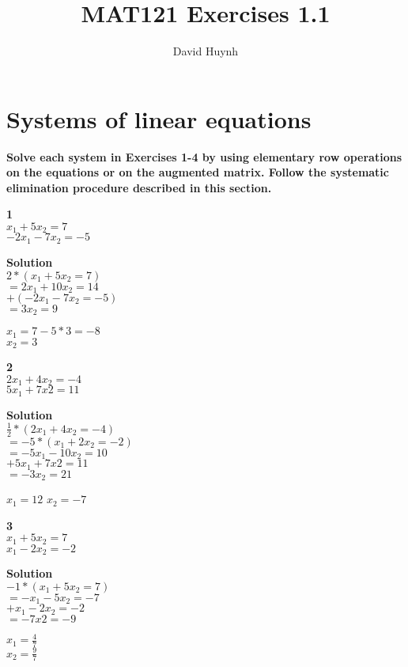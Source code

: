 \documentclass{article}
\begin{document}
\title{MAT121 Exercises 1.1}
\author{David Huynh}
\date{}

\maketitle

\section{Systems of linear equations}

\bf{Solve each system in Exercises 1-4 by using elementary row operations on the equations or on the augmented matrix. Follow the systematic elimination procedure described in this section.}

\bf{1}\\
$x_{1} + 5x_{2} = 7$\\
$-2x_{1} - 7x_{2} = -5$

\bf{Solution}\\
$2*(x_{1} + 5x_{2} = 7)$\\
$= 2x_{1} + 10x_{2} = 14$\\
$+(-2x_{1} - 7x_{2} = -5)$\\
$= 3x_{2} = 9$

$x_{1} = 7 - 5 * 3 = -8$\\
$x_{2}  = 3$

\bf{2}\\
$2x_{1} + 4x_{2} = -4$\\
$5x_{1} + 7x{2} = 11$

\bf{Solution}\\
$\frac{1}{2}*(2x_{1} + 4x_{2} = -4)$\\
$=-5*(x_{1} + 2x_{2} = -2)$\\
$=-5x_{1} - 10x_{2} = 10$\\
$+5x_{1} + 7x{2} = 11$\\
$= -3x_{2} = 21$

$x_{1} = 12$
$x_{2} = -7$

\bf{3}\\
$x_{1} + 5x_{2} = 7$\\
$x_{1} - 2x_{2} = -2$

\bf{Solution}\\
$-1*(x_{1} + 5x_{2} = 7)$\\
$=-x_{1} - 5x_{2} = -7$\\
$+x_{1} -2x_{2} = -2$\\
$= -7x{2} = -9$

$x_{1} = \frac{4}{7}$\\
$x_{2} = \frac{9}{7}$
\end{document}
